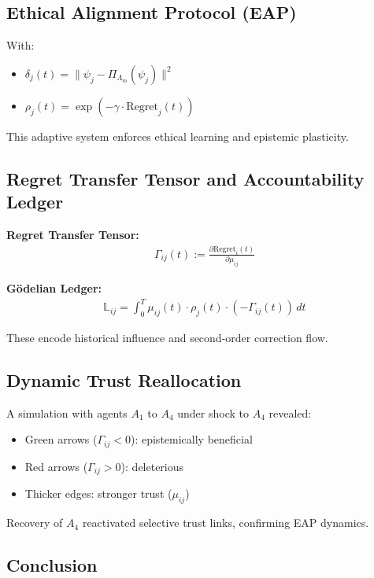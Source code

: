\documentclass[11pt]{article}
\begin{document}
\subsection{Ethical Alignment Protocol (EAP)}

With:

\begin{itemize}
  \item $\delta_j(t) = \|\psi_j - \Pi_{\Lambda_m}(\psi_j)\|^2$
  \item $\rho_j(t) = \exp(-\gamma \cdot \text{Regret}_j(t))$
\end{itemize}

This adaptive system enforces ethical learning and epistemic plasticity.

\subsection{Regret Transfer Tensor and Accountability Ledger}

\textbf{Regret Transfer Tensor:}
\begin{align}
\Gamma_{ij}(t) := \frac{\partial \text{Regret}_i(t)}{\partial \mu_{ij}}
\end{align}

\textbf{Gödelian Ledger:}
\begin{align}
\mathbb{L}_{ij} = \int_0^T \mu_{ij}(t) \cdot \rho_j(t) \cdot (-\Gamma_{ij}(t)) \, dt
\end{align}

These encode historical influence and second-order correction flow.

\subsection{Dynamic Trust Reallocation}

A simulation with agents $A_1$ to $A_4$ under shock to $A_4$ revealed:

\begin{itemize}
  \item Green arrows (\(\Gamma_{ij} < 0\)): epistemically beneficial
  \item Red arrows (\(\Gamma_{ij} > 0\)): deleterious
  \item Thicker edges: stronger trust ($\mu_{ij}$)
\end{itemize}

Recovery of $A_4$ reactivated selective trust links, confirming EAP dynamics.

\subsection{Conclusion}
\end{document}
